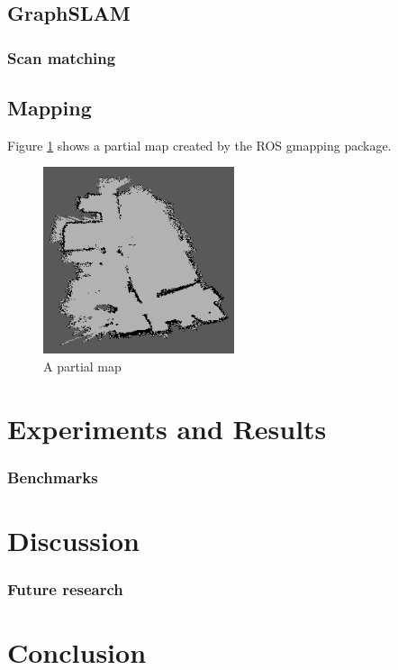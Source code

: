 \documentclass{ba-kecs}
\begin{document}
\subsection{GraphSLAM}
\subsubsection{Scan matching}
\subsection{Mapping}
Figure \ref{fig:random_map} shows a partial map created by the ROS gmapping package.
\begin{figure}[htbp]
	\centering
		\includegraphics[width=0.50\textwidth]{figures/random_map.png}
	\caption{A partial map}
	\label{fig:random_map}
\end{figure}

\section{Experiments and Results}
\subsubsection{Benchmarks}

\section{Discussion}
\subsubsection{Future research}

\section{Conclusion}


\nocite{*}
\onecolumn
\appendix
\end{document}
